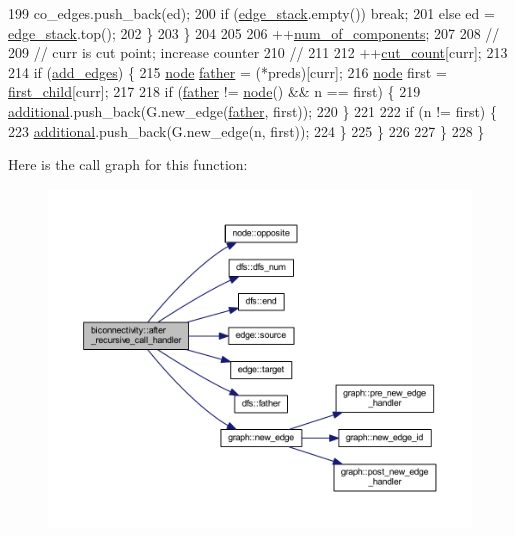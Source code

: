 \begin{DoxyCode}
199                 co\_edges.push\_back(ed);
200                 \textcolor{keywordflow}{if} (\mbox{\hyperlink{classbiconnectivity_a524ba263fc35d13aab5078ebfe8f5307}{edge\_stack}}.empty()) \textcolor{keywordflow}{break};
201                 \textcolor{keywordflow}{else} ed = \mbox{\hyperlink{classbiconnectivity_a524ba263fc35d13aab5078ebfe8f5307}{edge\_stack}}.top();
202             \}
203         \}
204 
205 
206         ++\mbox{\hyperlink{classbiconnectivity_a89fbd540b8a61aad150020be657ddfb7}{num\_of\_components}};
207 
208         \textcolor{comment}{//}
209         \textcolor{comment}{// curr is cut point; increase counter}
210         \textcolor{comment}{// }
211 
212         ++\mbox{\hyperlink{classbiconnectivity_a67756de28954d13df615d8f2a93b22da}{cut\_count}}[curr];
213 
214         \textcolor{keywordflow}{if} (\mbox{\hyperlink{classbiconnectivity_a70c1310b4ba83dbe10594f3a33f94763}{add\_edges}}) \{
215             \mbox{\hyperlink{classnode}{node}} \mbox{\hyperlink{classdfs_a3012717ce541b3e56943e2c2c50efdf6}{father}} = (*preds)[curr];
216             \mbox{\hyperlink{classnode}{node}} first = \mbox{\hyperlink{classbiconnectivity_a3292c5b6bf3b91947509a380cf779706}{first\_child}}[curr];
217 
218             \textcolor{keywordflow}{if} (\mbox{\hyperlink{classdfs_a3012717ce541b3e56943e2c2c50efdf6}{father}} != \mbox{\hyperlink{classnode}{node}}() && n == first) \{
219                 \mbox{\hyperlink{classbiconnectivity_ad5393f67b9526964db540fc63745318f}{additional}}.push\_back(G.new\_edge(\mbox{\hyperlink{classdfs_a3012717ce541b3e56943e2c2c50efdf6}{father}}, first));
220             \}
221 
222             \textcolor{keywordflow}{if} (n != first) \{
223                 \mbox{\hyperlink{classbiconnectivity_ad5393f67b9526964db540fc63745318f}{additional}}.push\_back(G.new\_edge(n, first));
224             \}
225         \}
226 
227     \}
228 \}
\end{DoxyCode}
Here is the call graph for this function\+:\nopagebreak
\begin{figure}[H]
\begin{center}
\leavevmode
\includegraphics[width=350pt]{classbiconnectivity_a69ca91409485b57c486b188596080d7a_cgraph}
\end{center}
\end{figure}
